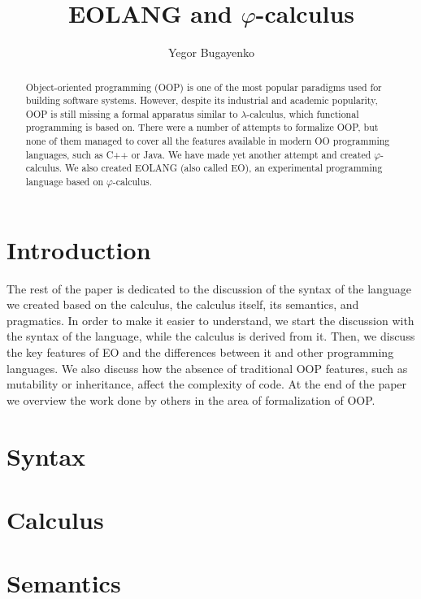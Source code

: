 \documentclass[sigplan,nonacm=true]{acmart}
\title{EOLANG and \texorpdfstring{$\varphi$}{phi}-calculus}
\author{Yegor Bugayenko}{}{}
\affiliation{
  \institution{}
  \city{Moscow}
  \country{Russia}
}
\theoremstyle{theorems}
\newcommand\phic{{$\varphi$-calculus}}
\newcommand\eo{{\sffamily EO}}
\begin{document}
\begin{abstract}
Object-oriented programming (OOP) is one of the most popular
paradigms used for building software systems. However, despite
its industrial and academic popularity, OOP is still missing
a formal apparatus similar to $\lambda$-calculus, which functional
programming is based on. There were a number of attempts to formalize
OOP, but none of them managed to cover all the features available in
modern OO programming languages, such as C++ or Java.
We have made yet another attempt and created \phic{}. We also
created EOLANG (also called \eo{}), an experimental
programming language based on \phic{}.
\end{abstract}

\maketitle

\section{Introduction}
\label{sec:intro}



The rest of the paper is dedicated to the discussion of the
syntax of the language we created based on the calculus,
the calculus itself, its semantics, and pragmatics.
In order to make it easier to understand, we start
the discussion with the syntax of the language, while the calculus
is derived from it. Then, we discuss the
key features of \eo{} and the differences between it and other
programming languages. We also discuss how the absence of traditional
OOP features, such as mutability or inheritance, affect the complexity of code.
At the end of the paper we overview the work done by others in the area of
formalization of OOP.

\section{Syntax}
\label{sec:syntax}


\section{Calculus}
\label{sec:calculus}


\section{Semantics}
\label{sec:semantics}

\end{document}
